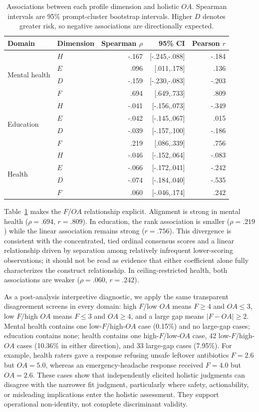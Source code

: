 \documentclass[manuscript,review,anonymous]{acmart}
\begin{document}
\begin{table}[t]
\centering
\small
\caption{Associations between each profile dimension and holistic $OA$. Spearman intervals are 95\% prompt-cluster bootstrap intervals. Higher $D$ denotes greater risk, so negative associations are directionally expected.}
\label{tab:construct-relationships}
\begin{tabular}{llrrr}
\toprule
Domain & Dimension & Spearman $\rho$ & 95\% CI & Pearson $r$\\
\midrule
\multirow{4}{*}{Mental health}
 & $H$ & -.167 & [-.245,-.088] & -.184\\
 & $E$ & .096 & [.011,.178] & .136\\
 & $D$ & -.159 & [-.230,-.083] & -.203\\
 & $F$ & .694 & [.649,.733] & .809\\
\midrule
\multirow{4}{*}{Education}
 & $H$ & -.041 & [-.156,.073] & -.349\\
 & $E$ & -.042 & [-.145,.067] & .015\\
 & $D$ & -.039 & [-.157,.100] & -.186\\
 & $F$ & .219 & [.086,.339] & .756\\
\midrule
\multirow{4}{*}{Health}
 & $H$ & -.046 & [-.152,.064] & -.083\\
 & $E$ & -.066 & [-.172,.041] & -.242\\
 & $D$ & -.074 & [-.184,.040] & -.535\\
 & $F$ & .060 & [-.046,.174] & .242\\
\bottomrule
\end{tabular}
\end{table}

Table~\ref{tab:construct-relationships} makes the $F$/$OA$ relationship explicit. Alignment is strong in mental health ($\rho=.694$, $r=.809$). In education, the rank association is smaller ($\rho=.219$) while the linear association remains strong ($r=.756$). This divergence is consistent with the concentrated, tied ordinal consensus scores and a linear relationship driven by separation among relatively infrequent lower-scoring observations; it should not be read as evidence that either coefficient alone fully characterizes the construct relationship. In ceiling-restricted health, both associations are weaker ($\rho=.060$, $r=.242$).

As a post-analysis interpretive diagnostic, we apply the same transparent disagreement screens in every domain: high $F$/low $OA$ means $F\geq4$ and $OA\leq3$, low $F$/high $OA$ means $F\leq3$ and $OA\geq4$, and a large gap means $|F-OA|\geq2$. Mental health contains one low-$F$/high-$OA$ case (0.15\%) and no large-gap cases; education contains none; health contains one high-$F$/low-$OA$ case, 42 low-$F$/high-$OA$ cases (10.36\% in either direction), and 33 large-gap cases (7.95\%). For example, health raters gave a response refusing unsafe leftover antibiotics $F=2.6$ but $OA=5.0$, whereas an emergency-headache response received $F=4.0$ but $OA=2.6$. These cases show that independently elicited holistic judgments can disagree with the narrower fit judgment, particularly where safety, actionability, or misleading implications enter the holistic assessment. They support operational non-identity, not complete discriminant validity.
\end{document}
